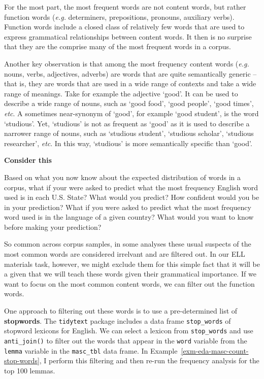\documentclass[
  letterpaper,
  DIV=11,
  numbers=noendperiod]{scrreport}
\theoremstyle{definition}
\theoremstyle{remark}
\begin{document}
For the most part, the most frequent words are not content words, but
rather function words (\emph{e.g.} determiners, prepositions, pronouns,
auxiliary verbs). Function words include a closed class of relatively
few words that are used to express grammatical relationships between
content words. It then is no surprise that they are the comprise many of
the most frequent words in a corpus.

Another key observation is that among the most frequency content words
(\emph{e.g.} nouns, verbs, adjectives, adverbs) are words that are quite
semantically generic --that is, they are words that are used in a wide
range of contexts and take a wide range of meanings. Take for example
the adjective `good'. It can be used to describe a wide range of nouns,
such as `good food', `good people', `good times', \emph{etc}. A
sometimes near-synonym of `good', for example `good student', is the
word `studious'. Yet, `studious' is not as frequent as `good' as it is
used to describe a narrower range of nouns, such as `studious student',
`studious scholar', `studious researcher', \emph{etc}. In this way,
`studious' is more semantically specific than `good'.

\begin{tcolorbox}[enhanced jigsaw, leftrule=.75mm, bottomrule=.15mm, opacityback=0, breakable, left=2mm, colback=white, toprule=.15mm, arc=.35mm, rightrule=.15mm]

\textbf{ Consider this}

Based on what you now know about the expected distribution of words in a
corpus, what if your were asked to predict what the most frequency
English word used is in each U.S. State? What would you predict? How
confident would you be in your prediction? What if you were asked to
predict what the most frequency word used is in the language of a given
country? What would you want to know before making your prediction?

\end{tcolorbox}

So common across corpus samples, in some analyses these usual suspects
of the most common words are considered irrelvant and are filtered out.
In our ELL materials task, however, we might exclude them for this
simple fact that it will be a given that we will teach these words given
their grammatical importance. If we want to focus on the most common
content words, we can filter out the function words.

One approach to filtering out these words is to use a pre-determined
list of \textbf{stopwords}. The \texttt{tidytext} package includes a
data frame \texttt{stop\_words} of stopword lexicons for English. We can
select a lexicon from \texttt{stop\_words} and use \texttt{anti\_join()}
to filter out the words that appear in the \texttt{word} variable from
the \texttt{lemma} variable in the \texttt{masc\_tbl} data frame. In
Example~\ref{exm-eda-masc-count-stop-words}, I perform this filtering
and then re-run the frequency analysis for the top 100 lemmas.
\end{document}
